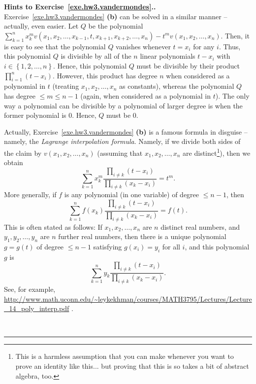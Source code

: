 \documentclass[numbers=enddot,12pt,final,onecolumn,notitlepage]{scrartcl}%
\theoremstyle{definition}
\newenvironment{proof}[1][Proof]{\noindent\textbf{#1.} }{\ \rule{0.5em}{0.5em}}
\let\sumnonlimits\sum
\let\prodnonlimits\prod
\renewcommand{\sum}{\sumnonlimits\limits}
\renewcommand{\prod}{\prodnonlimits\limits}
\newcommand{\set}[1]{\left\{ #1 \right\}}
\newcommand{\tup}[1]{\left( #1 \right)}
\begin{document}
\begin{proof}[Hints to Exercise~\ref{exe.hw3.vandermondes}.]
Exercise~\ref{exe.hw3.vandermondes} \textbf{(b)} can be solved in a
similar manner -- actually, even easier. Let $Q$ be the polynomial
$\sum_{k=1}^{n}x_{k}^{m}v\left(  x_{1},x_{2},\ldots,x_{k-1},t,x_{k+1}%
,x_{k+2},\ldots,x_{n}\right)
- t^{m}v\left(  x_{1},x_{2},\ldots,x_{n}\right)$.
Then, it is easy to see that the polynomial $Q$ vanishes whenever
$t = x_i$ for any $i$.
Thus, this polynomial $Q$ is divisible by all of the $n$
linear polynomials $t-x_i$ with $i \in \set{1, 2, \ldots, n}$.
Hence, this polynomial $Q$ must be divisible by their product
$\prod_{i=1}^n \tup{t-x_i}$.
However, this product has degree $n$ when considered as a polynomial
in $t$ (treating $x_1, x_2, \ldots, x_n$ as constants), whereas the
polynomial $Q$ has degree $\leq m \leq n-1$ (again, when considered
as a polynomial in $t$).
The only way a polynomial can be divisible by a polynomial of larger
degree is when the former polynomial is $0$. Hence, $Q$ must be $0$.

Actually,
Exercise~\ref{exe.hw3.vandermondes} \textbf{(b)} is a famous formula
in disguise -- namely, the \textit{Lagrange interpolation formula}.
Namely, if we divide both sides of the claim by
$v \tup{x_1, x_2, \ldots, x_n}$ (assuming that $x_1, x_2, \ldots, x_n$
are distinct\footnote{This is a harmless assumption that you can make
  whenever you want to prove an identity like this... but proving that
  this is so takes a bit of abstract algebra, too.}),
then we obtain
\[
\sum_{k=1}^n x_k^m \dfrac{\prod_{i \neq k} \tup{  t - x_i}}
                         {\prod_{i \neq k} \tup{x_k - x_i}}
= t^m .
\]
More generally, if $f$ is any polynomial (in one variable) of degree
$\leq n-1$, then
\[
\sum_{k=1}^n f \tup{x_k} \dfrac{\prod_{i \neq k} \tup{  t - x_i}}
                               {\prod_{i \neq k} \tup{x_k - x_i}}
= f \tup{t} .
\]
This is often stated as follows:
If $x_1, x_2, \ldots, x_n$ are $n$ distinct real numbers, and
$y_1, y_2, \ldots, y_n$ are $n$ further real numbers, then
there is a unique polynomial $g = g \tup{t}$ of degree $\leq n-1$
satisfying $g \tup{x_i} = y_i$ for all $i$, and this polynomial $g$ is
\[
\sum_{k=1}^n y_k \dfrac{\prod_{i \neq k} \tup{  t - x_i}}
                       {\prod_{i \neq k} \tup{x_k - x_i}}
.
\]
See, for example,
\url{http://www.math.uconn.edu/~leykekhman/courses/MATH3795/Lectures/Lecture_14_poly_interp.pdf} .


\end{proof}
\end{document}
